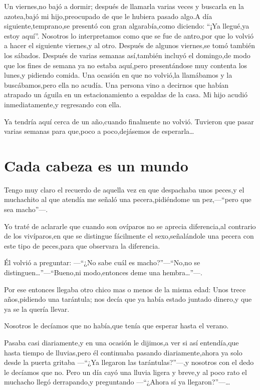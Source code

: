 \documentclass[letterpaper,12pt]{book}
\begin{document}
Un viernes,no bajó a dormir; después de llamarla varias veces y buscarla en la azotea,bajó mi hijo,preocupado de que le hubiera pasado algo.A día siguiente,temprano,se presentó con gran algarabía,como diciendo: ``¡Ya llegué,ya estoy aquí''. Nosotros lo interpretamos como que se fue de antro,por que lo volvió a hacer el siguiente viernes,y al otro. Después de algunos viernes,se tomó también los sábados. Después de varias semanas así,también incluyó el domingo,de modo que los fines de semana ya no estaba aquí,pero presentándose muy contenta los lunes,y pidiendo comida. Una ocasión en que no volvió,la llamábamos y  la buscábamos,pero ella no acudía. Una persona vino a decirnos que habían atrapado un águila en un estacionamiento a espaldas de la casa. Mi hijo acudió inmediatamente,y regresando con ella. 


Ya tendría aquí cerca de un año,cuando finalmente no volvió. Tuvieron que pasar varias semanas para que,poco a poco,dejásemos de esperarla\ldots


\chapter{Cada cabeza es un mundo}
Tengo muy claro el recuerdo de aquella vez en que despachaba unos peces,y el muchachito al que atendía me señaló una pecera,pidiéndome un pez,---``pero que sea macho''---.

Yo traté de aclararle que cuando son ovíparos no se aprecia diferencia,al contrario de los vivíparos,en que se distingue fácilmente el sexo,señalándole una pecera con este tipo de peces,para que observara la diferencia.

Él volvió a preguntar: ---``¿No sabe cuál es macho?''---``No,no se distinguen\ldots''---``Bueno,ni modo,entonces deme una hembra\ldots''---.

Por ese entonces llegaba otro chico mas o menos de la misma edad: Unos trece años,pidiendo una tarántula; nos decía que ya había estado juntado dinero,y que ya se la quería llevar.

Nosotros le decíamos que no había,que tenía que esperar hasta el verano.

Pasaba casi diariamente,y en una ocasión le dijimos,a ver si así entendía,que hasta tiempo de lluvias,pero él continuaba pasando diariamente,ahora ya solo desde la puerta gritaba ---``¿Ya llegaron las tarántulas?''---,y nosotros con el dedo le decíamos que no. Pero un día cayó una lluvia ligera y breve,y al poco rato el muchacho llegó derrapando,y preguntando ---``¿Ahora sí ya llegaron?''---\ldots
\end{document}

